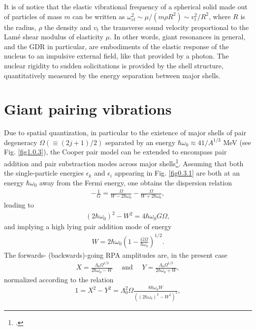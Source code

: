 It is of notice that the elastic vibrational frequency of a spherical solid made out of particles of mass $m$ can be written as $\omega_{el}^2\sim\mu/(m\rho R^2)\sim v_t^2/R^2$, where $R$ is the radius, $\rho$ the density and $v_t$ the transverse sound velocity proportional to the Lam\'e shear modulus of elasticity $\mu$.
In other words, giant resonances in general, and the GDR in particular, are embodiments of the elastic response of the nucleus to an impulsive external field, like that provided by a photon. The nuclear rigidity to sudden solicitations is provided by the shell structure, quantitatively measured by the energy separation between major shells.
\section{Giant pairing vibrations}\label{Sect2.6}
Due to spatial quantization, in particular to the existence of major shells of pair degeneracy $\Omega(\equiv(2j+1)/2)$ separated by an energy $\hbar\omega_0\approx41/A^{1/3}$ MeV (see Fig. \ref{fig1.0.3}), the Cooper pair model can be extended to encompass pair addition and pair substraction modes across major shells\footnote{\cite{Broglia:77}.}. Assuming that both the single-particle energies $\epsilon_k$ and $\epsilon_i$ appearing in Fig. \ref{fig0.3.1} are both at an energy    $\hbar\omega_0$ away from the Fermi energy, one obtains the dispersion relation 
\begin{align}\label{eq0.1.108}
-\frac{1}{G}=\frac{\Omega}{W-2\hbar\omega_0}-\frac{\Omega}{W+2\hbar\omega_0},
\end{align}
leading to
\begin{align}\label{eq0.1.109}
(2\hbar\omega_0)^2-W^2=4\hbar\omega_0G\Omega,
\end{align}
and implying a high lying pair addition mode of energy
\begin{align}\label{eq0.1.110}
W=2\hbar\omega_0\left(1-\frac{G\Omega}{\hbar\omega_0}\right)^{1/2}.
\end{align}
The forwards- (backwards)-going RPA amplitudes are, in the present case
\begin{align}\label{eq0.1.111}
X=\frac{\Lambda_0\Omega^{1/2}}{2\hbar\omega_0-W}\quad\text{ and      }\quad Y=\frac{\Lambda_0\Omega^{1/2}}{2\hbar\omega_0+W},
\end{align}
normalized according to the relation 
\begin{align}\label{eq0.1.112}
1=X^2-Y^2=\Lambda^2_0\Omega\frac{8\hbar\omega_0W}{\left((2\hbar\omega_0)^2-W^2\right)^2},
\end{align}
